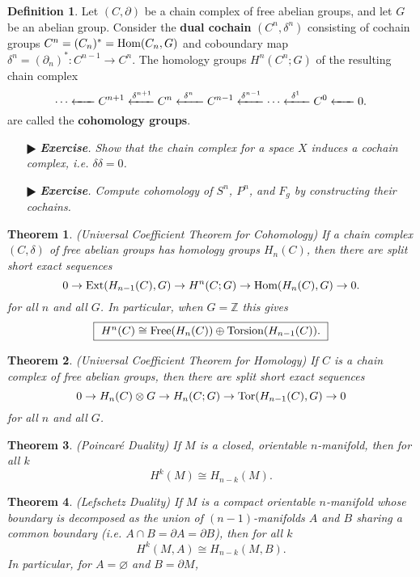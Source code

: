 \documentclass[11pt]{amsart}
\newtheorem*{theorem*}{Theorem}
\theoremstyle{definition}
\newtheorem*{definition*}{Definition}
\renewcommand\emptyset{\varnothing}
\renewcommand\:{\colon}
\newcommand{\Z}{\mathds{Z}}
\newcommand{\1}{\mathds{1}}
\newcommand{\Ext}{\textnormal{Ext}}
\newcommand{\Free}{\textnormal{Free}}
\newcommand{\Hom}{\textnormal{Hom}}
\newcommand{\Tor}{\textnormal{Tor}}
\newcommand{\Torsion}{\textnormal{Torsion}}
\newcommand{\exc}[1]{\vspace{-2.5pt}\begin{itemize}[leftmargin=15pt]\item[$\RHD$] \textit{\textbf{Exercise}. #1}\end{itemize}}
\begin{document}
\begin{definition*}
	Let $(C, \partial)$ be a chain complex of free abelian groups, and let $G$ be an abelian group. Consider the \textbf{dual cochain} $(C^n, \delta^n)$ consisting of cochain groups $C^n = (C_n)^* = \Hom(C_n, G)$ and coboundary map $\delta^n = (\partial_n)^*\: C^{n-1} \to C^n$. The homology groups $H^n(C^n; G)$ of the resulting chain complex 
		\[ \cdots \xleftarrow{\hspace{1.5em}} C^{n+1} \xleftarrow{\delta^{n+1}} C^n \xleftarrow{\ \delta^n \ \ } C^{n-1} \xleftarrow{\delta^{n-1}} \cdots \xleftarrow{\ \delta^1 \ \ } C^0 \xleftarrow{\hspace{1.5em}} 0. \]
	are called the \textbf{cohomology groups}.
\end{definition*}

\exc{Show that the chain complex for a space $X$ induces a cochain complex, i.e. $\delta\delta = 0$.}
\exc{Compute cohomology of $S^n$, $P^n$, and $F_g$ by constructing their cochains.}

\begin{theorem*}
	\textnormal{(Universal Coefficient Theorem for Cohomology)} If a chain complex $(C, \delta)$ of free abelian groups has homology groups $H_n(C)$, then there are split short exact sequences
		\[ 0 \to \Ext(H_{n-1}(C), G) \to H^n(C; G) \to \Hom(H_n(C), G) \to 0. \]
	for all $n$ and all $G$. In particular, when $G = \Z$ this gives
		\[ \fbox{ $H^n(C) \cong \Free(H_n(C)) \oplus \Torsion(H_{n-1}(C)).$ } \]
\end{theorem*}

\begin{theorem*}
	\textnormal{(Universal Coefficient Theorem for Homology)} If $C$ is a chain complex of free abelian groups, then there are split short exact sequences \[ 0 \to H_n(C) \otimes G \to H_n(C; G) \to \Tor(H_{n-1}(C), G) \to 0 \] for all $n$ and all $G$.
\end{theorem*}

\begin{theorem*}
	\textnormal{(Poincar\'e Duality)} If $M$ is a closed, orientable $n$-manifold, then for all $k$ \[ H^k(M) \cong H_{n-k}(M). \]
\end{theorem*}

\begin{theorem*}
	\textnormal{(Lefschetz Duality)} If $M$ is a compact orientable $n$-manifold whose boundary is decomposed as the union of $(n-1)$-manifolds $A$ and $B$ sharing a common boundary (i.e. $A \cap B = \partial A = \partial B$), then for all $k$ 
		\[ H^k(M, A) \cong H_{n-k}(M, B). \]
	In particular, for $A = \emptyset$ and $B = \partial M$, 
\end{theorem*}
\end{document}
